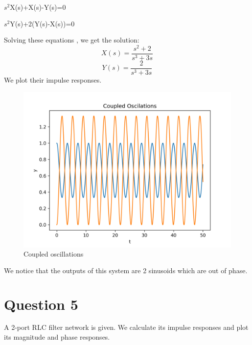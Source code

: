 \documentclass[11pt, a4paper]{article}
\begin{document}
$s^2$X(s)+X(s)-Y(s)=0

$s^2$Y(s)+2(Y(s)-X(s))=0

Solving these equations , we get the solution:
\begin{equation}
    X(s) = \frac{s^2+2}{s^3 + 3s}
\end{equation}
\begin{equation}
    Y(s) = \frac{2}{s^3 + 3s}
\end{equation}
We plot their impulse responses.


\begin{figure}[!tbh]
\centering
\includegraphics[scale=0.8]{assgn7_plot8.png} 
\caption{Coupled oscillations}
\label{fig8}
\end{figure}

We notice that the outputs of this system are 2 sinusoids which are out of
phase.

\section*{Question 5}
A 2-port RLC filter network is given. We calculate its impulse responses and plot its magnitude and phase responses.


\end{document}
